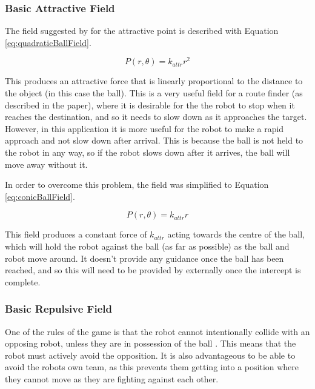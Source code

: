 \documentclass[10pt]{article}
\begin{document}
\subsubsection{Basic Attractive Field\label{sub:Basic-Attractive-Field}}

The field suggested by \cite{intelligentAlgorithmPathPlanning} for the
attractive point is described with Equation \ref{eq:quadraticBallField}.

\begin{equation}
P(r,\theta)=k_{attr}r^{2}\label{eq:quadraticBallField}
\end{equation}

This produces an attractive force that is linearly proportional to the distance
to the object (in this case the ball). This is a very useful field for a route
finder (as described in the paper), where it is desirable for the the robot to
stop when it reaches the destination, and so it needs to slow down as it
approaches the target. However, in this application it is more useful for the
robot to make a rapid approach and not slow down after arrival. This is because
the ball is not held to the robot in any way, so if the robot slows down after
it arrives, the ball will move away without it.

In order to overcome this problem, the field was simplified to Equation
\ref{eq:conicBallField}.

\begin{equation}
P(r,\theta)=k_{attr}r\label{eq:conicBallField}
\end{equation}

This field produces a constant force of $k_{attr}$ acting towards the centre of
the ball, which will hold the robot against the ball (as far as possible) as the
ball and robot move around. It doesn't provide any guidance once the ball has
been reached, and so this will need to be provided by externally once
the intercept is complete.

\subsubsection{Basic Repulsive Field\label{sub:Basic-Repulsive-Field}}

One of the rules of the game is that the robot cannot intentionally collide with
an opposing robot, unless they are in possession of the ball
\cite{simurosotSim}. This means that the robot must actively avoid the
opposition. It is also advantageous to be able to avoid the robots own team, as
this prevents them getting into a position where they cannot move as they are
fighting against each other.
\end{document}
